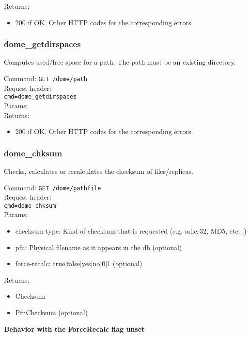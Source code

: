 \documentclass[a4paper,10pt]{scrreprt}
\begin{document}
Returns:
\begin{itemize}
 \item 200 if OK. Other HTTP codes for the corresponding errors.
\end{itemize}


\subsubsection{dome\_getdirspaces}
Computes used/free space for a path. The path must be an existing directory.

Command:
\lstinline"GET /dome/path"\\
Request header:\\
\lstinline"cmd=dome_getdirspaces"\\
Params:\\

Returns:
\begin{itemize}
 \item 200 if OK. Other HTTP codes for the corresponding errors.
\end{itemize}





\subsubsection{dome\_chksum}
 Checks, calculates or recalculates the checksum of files/replicas.
 

Command:
\lstinline"GET /dome/pathfile"\\
Request header:\\
\lstinline"cmd=dome_chksum"\\
Params:
\begin{itemize}
 \item checksum-type: Kind of checksum that is requested (e.g. adler32, MD5, etc...)
 \item pfn: Physical filename as it appears in the db (optional)
 \item force-recalc: true|false|yes|no|0|1 (optional)
\end{itemize}

Returns:
\begin{itemize}
 \item Checksum
 \item PfnChecksum (optional)
\end{itemize}

\textbf{Behavior with the ForceRecalc flag unset}\\
\end{document}

